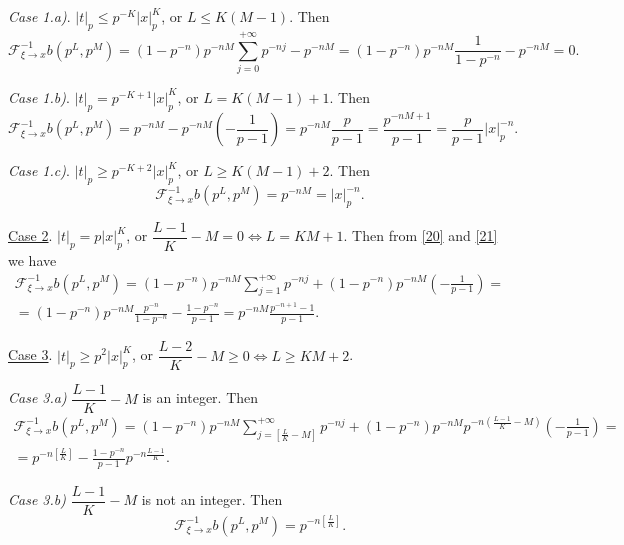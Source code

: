 \documentclass[14pt]{article}
\theoremstyle{theorem}
\theoremstyle{theorem}
\theoremstyle{definition}
\theoremstyle{lemma}
\newcommand{\Label}[1]{\label{#1}}
\numberwithin{equation}{section}
\begin{document}
\textit{Case 1.a)}. $|t|_p\leq p^{-K}|x|_p^K$, or $L\leq K(M-1)$. Then
\begin{equation}\Label{23}
\mathcal{F}_{\xi\to x}^{-1}b(p^L,p^M)=(1-p^{-n})p^{-nM}\sum\limits_{j=0}^{+\infty}p^{-nj}-p^{-nM}=(1-p^{-n})p^{-nM}\frac{1}{1-p^{-n}}-p^{-nM}=0.
\end{equation}

\textit{Case 1.b)}. $|t|_p=p^{-K+1}|x|_p^K$, or $L=K(M-1)+1$. Then
\begin{equation}\Label{24}
\mathcal{F}_{\xi\to x}^{-1}b(p^L,p^M)=p^{-nM}-p^{-nM}(-\frac{1}{p-1})=p^{-nM}\frac{p}{p-1}=\frac{p^{-nM+1}}{p-1}=\frac{p}{p-1}|x|_p^{-n}.
\end{equation}

\textit{Case 1.c)}. $|t|_p\geq p^{-K+2}|x|_p^K$, or $L\geq K(M-1)+2$. Then
\begin{equation}\Label{25}
\mathcal{F}_{\xi\to x}^{-1}b(p^L,p^M)=p^{-nM}=|x|_p^{-n}.
\end{equation}

\underline{Case 2}. $|t|_p=p|x|_p^K$, or $\dfrac{L-1}{K}-M=0\Longleftrightarrow L=KM+1$. Then from \eqref{20} and \eqref{21} we have
\begin{equation}\Label{26}
\begin{split}
\mathcal{F}_{\xi\to x}^{-1}b(p^L,p^M)=(1-p^{-n})p^{-nM}\sum\limits_{j=1}^{+\infty}p^{-nj}+(1-p^{-n})p^{-nM}(-\frac{1}{p-1})=\\
=(1-p^{-n})p^{-nM}\frac{p^{-n}}{1-p^{-n}}-\frac{1-p^{-n}}{p-1}=p^{-nM}\frac{p^{-n+1}-1}{p-1}.
\end{split}
\end{equation}

\underline{Case 3}. $|t|_p\geq p^2|x|_p^K$, or $\dfrac{L-2}{K}-M\geq0\Longleftrightarrow L\geq KM+2$.

\textit{Case 3.a)} $\dfrac{L-1}{K}-M$ is an integer. Then
\begin{equation}\Label{27}
\begin{split}
\mathcal{F}_{\xi\to x}^{-1}b(p^L,p^M)=(1-p^{-n})p^{-nM}\sum\limits_{j=[\frac{L}{K}-M]}^{+\infty}p^{-nj}+(1-p^{-n})p^{-nM}p^{-n(\frac{L-1}{K}-M)}(-\frac{1}{p-1})=\\
=p^{-n[\frac{L}{K}]}-\frac{1-p^{-n}}{p-1}p^{-n\frac{L-1}{K}}.
\end{split}
\end{equation}

\textit{Case 3.b)} $\dfrac{L-1}{K}-M$ is not an integer. Then
\begin{equation}\Label{28}
\mathcal{F}_{\xi\to x}^{-1}b(p^L,p^M)=p^{-n[\frac{L}{K}]}.
\end{equation}
\end{document}
